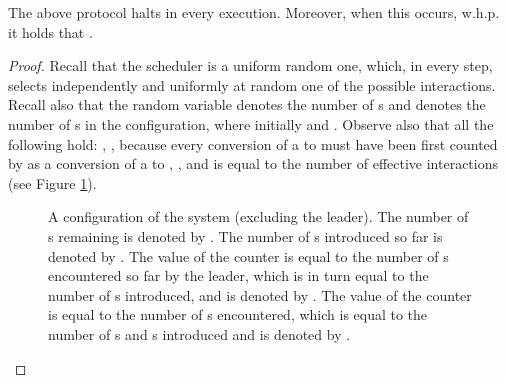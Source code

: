 \documentclass[oribibl, 11pt]{llncs}
\begin{document}
\begin{theorem} \label{the:count-half}
The above protocol halts in every execution. Moreover, when this occurs, w.h.p. it holds that .
\end{theorem}
\begin{proof}
Recall that the scheduler is a uniform random one, which, in every step, selects independently and uniformly at random one of the  possible interactions. Recall also that the random variable  denotes the number of s and  denotes the number of s in the configuration, where initially  and . Observe also that all the following hold: , , because every conversion of a  to  must have been first counted by  as a conversion of a  to , , and  is equal to the number of effective interactions (see Figure \ref{fig:counting-random-variables}).

\begin{figure}[!hbtp]
\caption{A configuration of the system (excluding the leader). The number of s remaining is denoted by . The number of s introduced so far is denoted by . The value of the counter  is equal to the number of s encountered so far by the leader, which is in turn equal to the number of s introduced, and is denoted by . The value of the counter  is equal to the number of s encountered, which is equal to the number of s and s introduced and is denoted by .} \label{fig:counting-random-variables}
\end{figure}


\end{proof}
\end{document}
